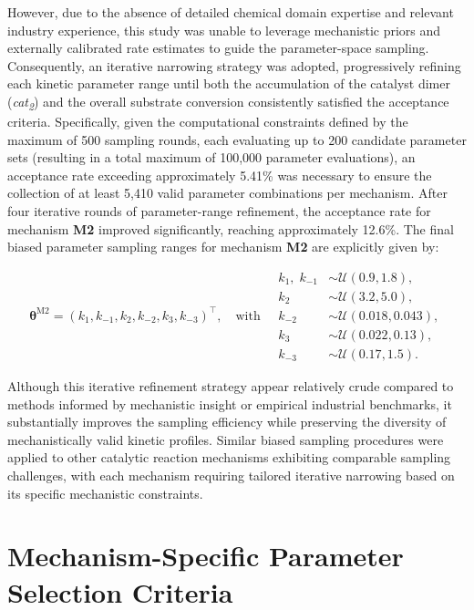 \documentclass{dissertation}
\begin{document}
However, due to the absence of detailed chemical domain expertise and relevant industry experience, this study was unable to leverage mechanistic priors and externally calibrated rate estimates to guide the parameter-space sampling. Consequently, an iterative narrowing strategy was adopted, progressively refining each kinetic parameter range until both the accumulation of the catalyst dimer (\emph{cat\textsubscript{2}}) and the overall substrate conversion consistently satisfied the acceptance criteria. Specifically, given the computational constraints defined by the maximum of 500 sampling rounds, each evaluating up to 200 candidate parameter sets (resulting in a total maximum of 100,000 parameter evaluations), an acceptance rate exceeding approximately 5.41\% was necessary to ensure the collection of at least 5,410 valid parameter combinations per mechanism. After four iterative rounds of parameter-range refinement, the acceptance rate for mechanism \textbf{M2} improved significantly, reaching approximately 12.6\%. The final biased parameter sampling ranges for mechanism \textbf{M2} are explicitly given by:

\begin{equation}
\boldsymbol{\theta}^{\mathrm{M2}} 
= (k_1, k_{-1}, k_2, k_{-2}, k_3, k_{-3})^{\top}, \quad
\text{with} \quad
\begin{array}{ll}
k_1,\; k_{-1} &\sim \mathcal{U}(0.9, 1.8), \\
k_2 &\sim \mathcal{U}(3.2, 5.0), \\
k_{-2} &\sim \mathcal{U}(0.018, 0.043), \\
k_3 &\sim \mathcal{U}(0.022, 0.13), \\
k_{-3} &\sim \mathcal{U}(0.17, 1.5).
\end{array}
\label{eq:M2_biased_sampler}
\end{equation}

Although this iterative refinement strategy appear relatively crude compared to methods informed by mechanistic insight or empirical industrial benchmarks, it substantially improves the sampling efficiency while preserving the diversity of mechanistically valid kinetic profiles. Similar biased sampling procedures were applied to other catalytic reaction mechanisms exhibiting comparable sampling challenges, with each mechanism requiring tailored iterative narrowing based on its specific mechanistic constraints.



\section{Mechanism-Specific Parameter Selection Criteria}
\label{sec:mechanism_specific_parameter_selection_criteria}
\end{document}
